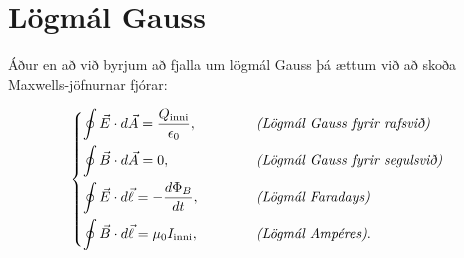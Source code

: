 \ifdefined \wholebook \else\documentclass[oneside]{book}\usepackage{EdlBook}\graphicspath{{figures/}}
\begin{document}
%
\setcounter{chapter}{14} %
%
\fi

\renewcommand{\thefigure}{\arabic{figure}}

\chapter{Lögmál Gauss}

Áður en að við byrjum að fjalla um lögmál Gauss þá ættum við að skoða Maxwells-jöfnurnar fjórar:

\begin{align*}
    \begin{dcases*}
     \oint \Vec{E} \cdot d\Vec{A} = \frac{Q_{\text{inni}}}{\epsilon_0}, & \hspace{1cm} \emph{(Lögmál Gauss fyrir rafsvið)} \\
     \oint \Vec{B} \cdot d\Vec{A} = 0, & \hspace{1cm} \emph{(Lögmál Gauss fyrir segulsvið)} \\ 
     \oint \vec{E} \cdot d\vec{\ell} = - \frac{d\Phi_B}{dt}, & \hspace{1cm} \emph{(Lögmál Faradays)} \\
     \oint \vec{B} \cdot d \vec{\ell} = \mu_0 I_{\text{inni}}, & \hspace{1cm} \emph{(Lögmál Ampéres)}.
    \end{dcases*}
\end{align*}
\end{document}
